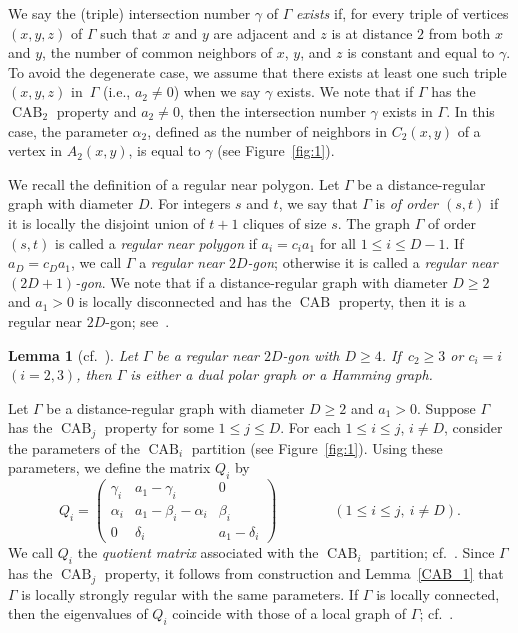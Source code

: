 \documentclass[11pt]{article}
\newtheorem{lemm}[theo]{Lemma}
\theoremstyle{definition}
\numberwithin{equation}{section}
\numberwithin{equation}{section}
\begin{document}
We say the (triple) intersection number $\gamma$ of $\Gamma$ \emph{exists} if, for every triple of vertices $(x,y,z)$ of $\Gamma$ such that $x$ and $y$ are adjacent and $z$ is at distance $2$ from both $x$ and $y$, the number of common neighbors of $x$, $y$, and $z$ is constant and equal to $\gamma$.
To avoid the degenerate case, we assume that there exists at least one such triple $(x,y,z)$ in~$\Gamma$ (i.e., $a_2\neq0$) when we say $\gamma$ exists.
We note that if $\Gamma$ has the $\operatorname{CAB}_2$ property and $a_2\neq 0$, then the intersection number $\gamma$ exists in $\Gamma$. 
In this case, the parameter $\alpha_2$, defined as the number of neighbors in $C_2(x,y)$ of a vertex in $A_2(x,y)$, is equal to $\gamma$ (see Figure~\ref{fig:1}).

We recall the definition of a regular near polygon.
Let $\Gamma$ be a distance-regular graph with diameter $D$.
For integers $s$ and $t$, we say that $\Gamma$ is \emph{of order $(s,t)$} if it is locally the disjoint union of $t+1$ cliques of size $s$.
The graph $\Gamma$ of order $(s,t)$ is called a \emph{regular near polygon} if $a_i=c_ia_1$ for all $1\leq i \leq D-1$.
If $a_D=c_Da_1$, we call $\Gamma$ a \emph{regular near $2D$-gon}; otherwise it is called a \emph{regular near $(2D+1)$-gon}.
We note that if a distance-regular graph with diameter $D \geqslant 2$ and $a_1 > 0$ is locally disconnected and has the $\operatorname{CAB}$ property, then it is a regular near $2D$-gon; see~\cite[Theorem 2.3]{JK2000-1}.

\begin{lemm}[{cf.~\cite[Theorem~9.11]{DaKoTa}}]\label{dual polar}
Let $\Gamma$ be a regular near $2D$-gon with $D \geqslant 4$. 
If~$c_2 \geqslant 3$ or $c_i = i$ $(i=2,3)$, then $\Gamma$ is either a dual polar graph or a Hamming graph.
\end{lemm}

Let $\Gamma$ be a distance-regular graph with diameter $D\geqslant 2$ and $a_1>0$.
Suppose $\Gamma$ has the $\operatorname{CAB}_j$ property for some $1\leq j \leq D$.
For each $1\leqslant i \leqslant j$, $i\neq D$, consider the parameters of the $\operatorname{CAB}_i$ partition (see Figure~\ref{fig:1}).
Using these parameters, we define the matrix $Q_i$ by
\begin{equation}\label{Qi}
	Q_i =
	\begin{pmatrix}
	\gamma_i & a_1-\gamma_i & 0 \\
	\alpha_i & a_1 -\beta_i -\alpha_i & \beta_i \\ 
	0 & \delta_i & a_1 -\delta_i
	\end{pmatrix}
	\qquad \qquad 
	(1 \leqslant i \leqslant j, \ i \neq D).
\end{equation}
We call $Q_i$ the \emph{quotient matrix} associated with the $\operatorname{CAB}_i$ partition; cf.~{\cite[Theorem~2.4]{JK2000-1}}.
Since $\Gamma$ has the $\operatorname{CAB}_j$ property, it follows from construction and Lemma~\ref{CAB_1} that $\Gamma$ is locally strongly regular with the same parameters.
If $\Gamma$ is locally connected, then the eigenvalues of $Q_i$ coincide with those of a local graph of $\Gamma$; cf.~\cite[Lemma~2.6]{JK2000-1}.
\end{document}
